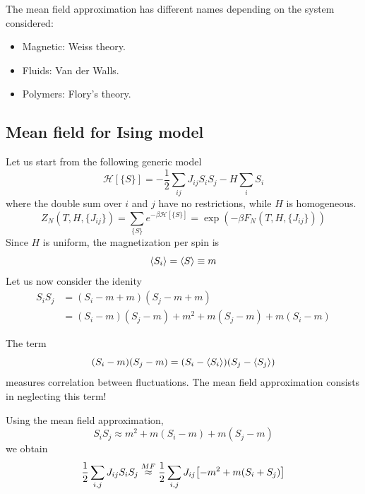 \documentclass[../main/main.tex]{subfiles}
\begin{document}
The mean field approximation has different names depending on the system considered:
\begin{itemize}
\item Magnetic: Weiss theory.
\item Fluids: Van der Walls.
\item Polymers: Flory's theory.
\end{itemize}

\subsection{Mean field for Ising model}
Let us start from the following generic model
\begin{equation}
  \mathcal{H} [\{ S \}  ] =  -\frac{1}{2} \sum_{ij}^{} J_{ij} S_i S_j - H \sum_{i}^{} S_i
\end{equation}
where the double sum over \( i \) and \( j \) have no restrictions, while \( H \) is homogeneous.
\begin{equation}
  Z_N (T,H,\{ J_{ij} \}  )= \sum_{\{ S \}  }^{} e^{-\beta   \mathcal{H} [\{ S \}] } = \exp (-\beta F_N (T,H,\{ J_{ij} \}  ))
\end{equation}
Since \( H \) is uniform, the magnetization per spin is
\begin{equation}
  \expval{S_i}  = \expval{S} \equiv m
\end{equation}
Let us now consider the idenity
\begin{equation}
\begin{split}
  S_i S_j  &= (S_i - m + m) (S_j - m + m)  \\
  & = (S_i - m ) (S_j - m)  + m^2 + m (S_j-m) + m (S_i-m)
\end{split}
\end{equation}
\begin{remark}
The term
\begin{equation*}
  (S_i - m ) (S_j - m) = (S_i - \expval{S_i})(S_j - \expval{S_j})
\end{equation*}
measures correlation between fluctuations. The mean field approximation consists in neglecting this term!
\end{remark}
Using the mean field approximation,
\begin{equation}
  S_i S_j  \approx m^2 + m(S_i-m) + m(S_j-m)
\end{equation}
we obtain
\begin{equation}
  \frac{1}{2} \sum_{i,j}^{} J_{ij}S_i S_j \overset{MF}{\approx } \frac{1}{2} \sum_{i,j }^{} J_{ij} \qty[-m^2+m(S_i+S_j)]
\end{equation}
\end{document}
